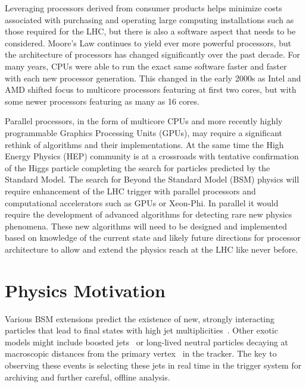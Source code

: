 \documentclass[preprint,sort&compress]{elsarticle}
\begin{document}
Leveraging processors derived from consumer products helps minimize costs associated with purchasing and operating large computing installations such as those required for the LHC, but there is also a software aspect that needs to be considered.  Moore's Law continues to yield ever more powerful processors, but the architecture of processors has changed significantly over the past decade.  For many years, CPUs were able to run the exact same software faster and faster with each new processor generation.  This changed in the early 2000s as Intel and AMD shifted focus to multicore processors featuring at first two cores, but with some newer processors featuring as many as 16 cores.

Parallel processors, in the form of multicore CPUs and more recently highly programmable Graphics Processing Units (GPUs), may require a significant rethink of algorithms and their implementations.  At the same time the High Energy Physics (HEP) community is at a crossroads with tentative confirmation of the Higgs particle completing the search for particles predicted by the Standard Model.  The search for Beyond the Standard Model (BSM) physics will require enhancement of the LHC trigger with parallel processors and computational accelerators such as GPUs or Xeon-Phi. In parallel it would require the development of advanced algorithms for detecting rare new physics phenomena. These new algorithms will need to be designed and implemented based on knowledge of the current state and likely future directions for processor architecture to allow and extend the physics reach at the LHC like never before.

\section{Physics Motivation}

Various BSM extensions predict the existence of new, strongly interacting particles that lead to final states
with high jet multiplicities~\cite{bib:sixjets,bib:multijets,bib:tcgut,bib:exoquarks,bib:unichiral,bib:altchiral}. Other exotic models might include boosted 
jets~\cite{Thaler:2008ju,Altheimer:2012mn} or long-lived neutral particles decaying at macroscopic distances 
from the primary vertex~\cite{bib:hiddenvalley,Halyo:2013yfa} 
in the tracker. The key to observing these events is selecting these jets in real time in the trigger system for archiving
 and further careful, offline analysis.
\end{document}
